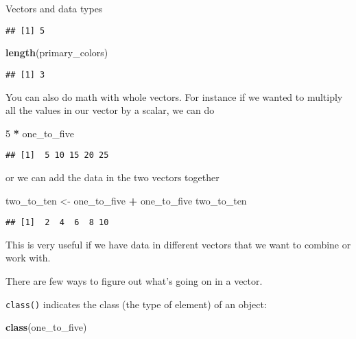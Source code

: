 \documentclass[
  11pt,
  ignorenonframetext,
]{beamer}
\newenvironment{Shaded}{\begin{snugshade}}{\end{snugshade}}
\newcommand{\DecValTok}[1]{\textcolor[rgb]{0.00,0.00,0.81}{#1}}
\newcommand{\KeywordTok}[1]{\textcolor[rgb]{0.13,0.29,0.53}{\textbf{#1}}}
\newcommand{\NormalTok}[1]{#1}
\newcommand{\OperatorTok}[1]{\textcolor[rgb]{0.81,0.36,0.00}{\textbf{#1}}}
\newcommand{\StringTok}[1]{\textcolor[rgb]{0.31,0.60,0.02}{#1}}
\begin{document}
\begin{frame}[fragile]{Vectors and data types}
\begin{verbatim}
## [1] 5
\end{verbatim}

\begin{Shaded}
\begin{Highlighting}[]
\KeywordTok{length}\NormalTok{(primary_colors)}
\end{Highlighting}
\end{Shaded}

\begin{verbatim}
## [1] 3
\end{verbatim}

You can also do math with whole vectors. For instance if we wanted to
multiply all the values in our vector by a scalar, we can do

\begin{Shaded}
\begin{Highlighting}[]
\DecValTok{5} \OperatorTok{*}\StringTok{ }\NormalTok{one_to_five}
\end{Highlighting}
\end{Shaded}

\begin{verbatim}
## [1]  5 10 15 20 25
\end{verbatim}

or we can add the data in the two vectors together

\begin{Shaded}
\begin{Highlighting}[]
\NormalTok{two_to_ten <-}\StringTok{ }\NormalTok{one_to_five }\OperatorTok{+}\StringTok{ }\NormalTok{one_to_five}
\NormalTok{two_to_ten}
\end{Highlighting}
\end{Shaded}

\begin{verbatim}
## [1]  2  4  6  8 10
\end{verbatim}

This is very useful if we have data in different vectors that we want to
combine or work with.

There are few ways to figure out what's going on in a vector.

\texttt{class()} indicates the class (the type of element) of an object:

\begin{Shaded}
\begin{Highlighting}[]
\KeywordTok{class}\NormalTok{(one_to_five)}
\end{Highlighting}
\end{Shaded}


\end{frame}
\end{document}
